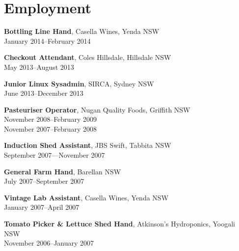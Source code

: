 \documentclass[10pt,a4paper]{article}
\renewenvironment{itemize}{
\begin{list}{}{
\setlength{\leftmargin}{1.5em}
\setlength{\itemsep}{0.25em}
\setlength{\parskip}{0pt}
\setlength{\parsep}{0.25em}
}
}{
\end{list}
}
\begin{document}
\section*{Employment}
\begin{itemize}

\item \textbf{Bottling Line Hand}, Casella Wines, Yenda NSW \\
January 2014--February 2014

\item \textbf{Checkout Attendant}, Coles Hillsdale, Hillsdale NSW \\
May 2013--August 2013

\item \textbf{Junior Linux Sysadmin}, SIRCA, Sydney NSW \\
June 2013--December 2013

\item \textbf{Pasteuriser Operator}, Nugan Quality Foods, Griffith NSW\\
November 2008--February 2009 \\
November 2007--February 2008 

\item \textbf{Induction Shed Assistant}, JBS Swift, Tabbita NSW\\
September 2007---November 2007

\item \textbf{General Farm Hand}, Barellan NSW\\
July 2007--September 2007

\item \textbf{Vintage Lab Assistant}, Casella Wines, Yenda NSW\\
January 2007--April 2007

\item \textbf{Tomato Picker \& Lettuce Shed Hand}, Atkinson's Hydroponics, 
Yoogali NSW\\
November 2006--January 2007

\end{itemize}

\vspace{-0.6cm}
\end{document}

